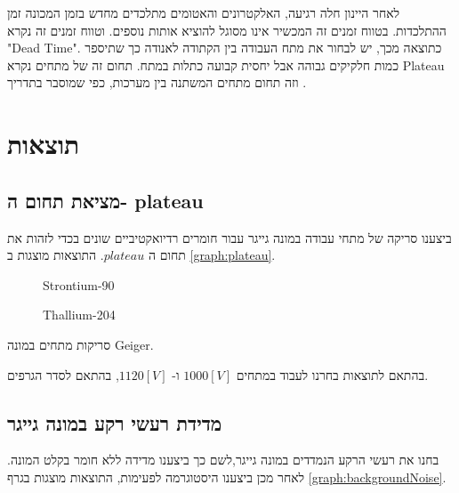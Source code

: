 \documentclass{article}
\begin{document}
לאחר היינון חלה רגיעה,
האלקטרונים והאטומים מתלכדים מחדש בזמן המכונה זמן ההתלכדות. בטווח זמנים זה המכשיר אינו מסוגל להוציא אותות נוספים. וטווח זמנים זה נקרא
\textenglish{"Dead Time"}.
כתוצאה מכך, יש לבחור את מתח העבודה בין הקתודה לאנודה כך שתיספר כמות חלקיקים גבוהה אבל יחסית קבועה כתלות במתח. תחום זה של מתחים נקרא
\textenglish{Plateau}
וזה תחום מתחים המשתנה בין מערכות, כפי שמוסבר בתדריך
\cite{Manual}.

\clearpage

\section{
תוצאות
}
\subsection{
מציאת תחום ה-
plateau
}
ביצענו סריקה של מתחי עבודה במונה גייגר עבור חומרים רדיואקטיביים שונים בכדי לזהות את תחום ה
$plateau$.
התוצאות מוצגות ב
\ref{graph:plateau}.

\begin{graph}[H]
    \centering
    \begin{subfigure}[b]{0.49\textwidth}
    	\centering
    	\resizebox{\textwidth}{!}{}
    	\caption{\textenglish{Strontium-90}}
    
    \end{subfigure}
    \hfill
    \begin{subfigure}[b]{0.49\textwidth}
    	\centering
    	\resizebox{\textwidth}{!}{}
        \caption{\textenglish{Thallium-204}}
    \end{subfigure}
    \caption{
    סריקות מתחים במונה
    \textenglish{Geiger}.
    }
    \label{graph:plateau}
\end{graph}

בהתאם לתוצאות בחרנו לעבוד במתחים 
$1000[V]$
ו-
$1120[V]$,
בהתאם לסדר הגרפים.

\subsection{
מדידת רעשי רקע במונה גייגר
}
בחנו את רעשי הרקע הנמדדים במונה גייגר,לשם כך ביצענו מדידה ללא חומר בקלט המונה. לאחר מכן ביצענו היסטוגרמה לפעימות, התוצאות מוצגות בגרף
\ref{graph:backgroundNoise}.
\end{document}
